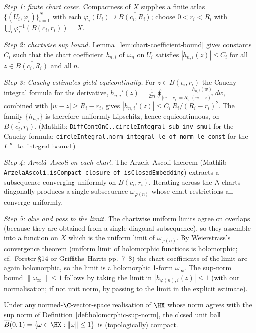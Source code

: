 \begin{proofsketch}
\emph{Step 1: finite chart cover.} Compactness of \(X\) supplies a
finite atlas \(\{(U_i,\varphi_i)\}_{i=1}^{N}\) with each
\(\varphi_i(U_i) \supseteq \overline{B(c_i, R_i)}\); choose
\(0 < r_i < R_i\) with \(\bigcup_i \varphi_i^{-1}(B(c_i, r_i)) = X\).

\emph{Step 2: chartwise sup bound.} Lemma~\ref{lem:chart-coefficient-bound}
gives constants \(C_i\) such that the chart coefficient
\(h_{n,i}\) of \(\omega_n\) on \(U_i\) satisfies
\(|h_{n,i}(z)| \le C_i\) for all \(z \in \overline{B(c_i, R_i)}\) and
all \(n\).

\emph{Step 3: Cauchy estimates yield equicontinuity.} For
\(z \in \overline{B(c_i, r_i)}\) the Cauchy integral formula for the
derivative,
\(h_{n,i}'(z) = \frac{1}{2\pi i}\oint_{|w-c_i|=R_i}
\frac{h_{n,i}(w)}{(w-z)^2}\,dw\),
combined with \(|w-z| \ge R_i - r_i\), gives
\(|h_{n,i}'(z)| \le C_i \,R_i / (R_i - r_i)^2\). The family
\(\{h_{n,i}\}\) is therefore uniformly Lipschitz, hence equicontinuous,
on \(\overline{B(c_i, r_i)}\). (Mathlib:
\texttt{DiffContOnCl.circleIntegral\_sub\_inv\_smul} for the
Cauchy formula;
\texttt{circleIntegral.norm\_integral\_le\_of\_norm\_le\_const} for the
\(L^{\infty}\)–to–integral bound.)

\emph{Step 4: Arzelà–Ascoli on each chart.} The Arzelà–Ascoli theorem
(Mathlib \texttt{ArzelaAscoli.isCompact\_closure\_of\_isClosedEmbedding})
extracts a subsequence converging uniformly on
\(\overline{B(c_i, r_i)}\). Iterating across the \(N\) charts
diagonally produces a single subsequence
\(\omega_{\varphi(n)}\) whose chart restrictions all converge
uniformly.

\emph{Step 5: glue and pass to the limit.} The chartwise uniform
limits agree on overlaps (because they are obtained from a single
diagonal subsequence), so they assemble into a function on \(X\) which
is the uniform limit of \(\omega_{\varphi(n)}\). By Weierstrass's
convergence theorem (uniform limit of holomorphic functions is
holomorphic; cf.\ Forster \S 14 or Griffiths–Harris pp.~7–8) the chart
coefficients of the limit are again holomorphic, so the limit is a
holomorphic 1-form \(\omega_\infty\). The sup-norm bound
\(\|\omega_\infty\|\le 1\) follows by taking the limit in
\(|h_{\varphi(n),i}(z)|\le 1\) (with our normalisation; if not unit
norm, by passing to the limit in the explicit estimate).
\end{proofsketch}

\begin{theorem}
\label{thm:hone-unit-ball-compact}
Under any normed-\(\C\)-vector-space realisation of \(\HX\) whose norm
agrees with the sup norm of
Definition~\ref{def:holomorphic-sup-norm}, the closed unit ball
\(\overline{B}(0,1) = \{\omega \in \HX : \|\omega\|\le 1\}\) is
(topologically) compact.
\leanok
\end{theorem}

